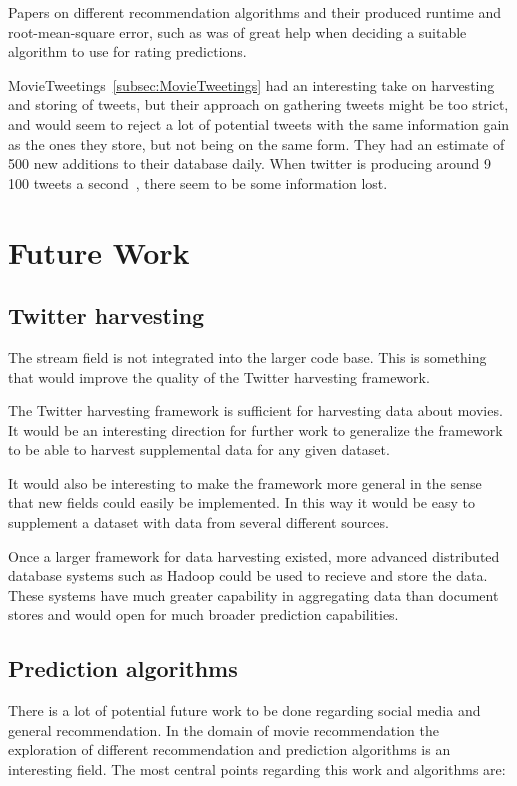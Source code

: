 Papers on different recommendation algorithms and their produced runtime and root-mean-square error, such as \cite{bigchaos-sol,alsMPI,BellKor-CF-TD} was of great help when deciding a suitable algorithm to use for rating predictions.

MovieTweetings~\ref{subsec:MovieTweetings} had an interesting take on harvesting and storing of tweets, but their approach on gathering tweets might be too strict, and would seem to reject a lot of potential tweets with the same information gain as the ones they store, but not being on the same form. They had an estimate of 500 new additions to their database daily. When twitter is producing around 9 100 tweets a second~\cite{twitt-stats}, there seem to be some information lost.



\section{Future Work}
\subsection{Twitter harvesting}
The stream field is not integrated into the larger code base. This is something that would improve the quality of the Twitter harvesting framework.

The Twitter harvesting framework is sufficient for harvesting data about movies. It would be an interesting direction for further work to generalize the framework to be able to harvest supplemental data for any given dataset.

It would also be interesting to make the framework more general in the sense that new fields could easily be implemented. In this way it would be easy to supplement a dataset with data from several different sources.

Once a larger framework for data harvesting existed, more advanced distributed database systems such as Hadoop could be used to recieve and store the data. These systems have much greater capability in aggregating data than document stores and would open for much broader prediction capabilities.


\subsection{Prediction algorithms}
There is a lot of potential future work to be done regarding social media and general recommendation. In the domain of movie recommendation the exploration of different recommendation and prediction algorithms is an interesting field. The most central points regarding this work and algorithms are:

